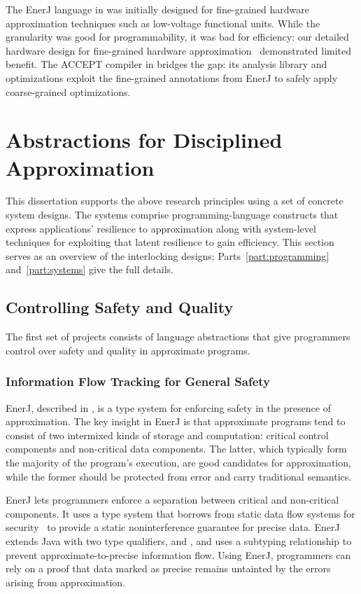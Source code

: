 The EnerJ language in  was initially designed for
fine-grained hardware approximation techniques such as low-voltage functional
units.
While the granularity was good for programmability, it was bad for efficiency:
our detailed hardware design for fine-grained hardware
approximation~\cite{truffle} demonstrated limited benefit.
The ACCEPT compiler in  bridges the gap: its analysis
library and optimizations exploit the fine-grained annotations from EnerJ to
safely apply coarse-grained optimizations.


\section{Abstractions for Disciplined Approximation}

This dissertation supports the above research principles using a set of
concrete system designs.
The systems comprise programming-language constructs that express
applications' resilience to approximation along with system-level
techniques for exploiting that latent resilience to gain efficiency.
This section serves as an overview of the interlocking designs;
Parts~\ref{part:programming} and~\ref{part:systems} give the full details.

\subsection{Controlling Safety and Quality}

The first set of projects consists of language abstractions that give
programmers control over safety and quality in approximate programs.

\subsubsection{Information Flow Tracking for General Safety}

EnerJ, described in , is a type system for enforcing safety in
the presence of approximation.
The key insight in EnerJ is that approximate programs tend to consist of two
intermixed kinds of storage and computation:
critical control components
and non-critical data components.
The latter, which typically form the majority of the program's execution,
are good candidates for approximation,
while the former should be protected from error and carry traditional
semantics.

EnerJ lets programmers enforce a separation between critical and non-critical
components.
It uses a type system that
borrows from static data
flow systems for security~\cite{jif} to provide a static
noninterference guarantee for precise data.
EnerJ extends Java with two type qualifiers,  and
, and uses a subtyping relationship to prevent
approximate-to-precise information flow.
Using EnerJ, programmers can rely
on a proof that data marked as precise remains untainted by the errors arising
from approximation.

